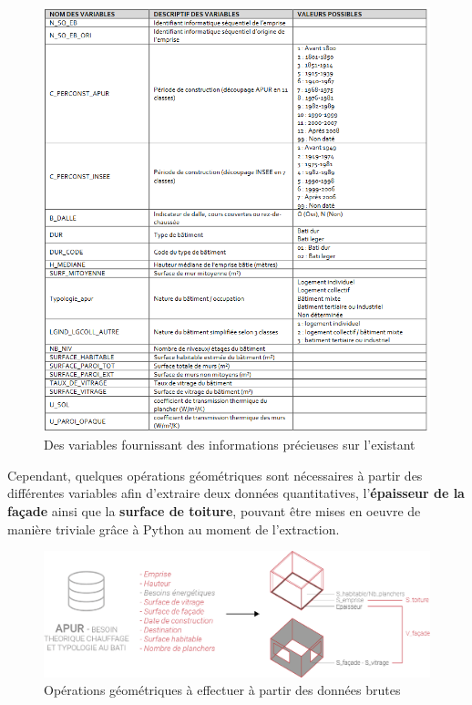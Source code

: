 \documentclass[
  11pt,
  french,
]{article}
\begin{document}
\begin{tcolorbox}
\begin{figure}

{\centering \includegraphics[width=0.9\linewidth]{__imgs/meta_apur} 

}

\caption[Des variables fournissant des informations précieuses sur l'existant  -  \url{https://www.apur.org/open_data/BESOIN_THEORIQUE_CHAUFFAGE_TYPO_BATI_OD.pdf}]{Des variables fournissant des informations précieuses sur l'existant}\label{fig:meta_apur}
\end{figure}
\end{tcolorbox}

Cependant, quelques opérations géométriques sont nécessaires à partir
des différentes variables afin d'extraire deux données quantitatives,
l'\textbf{épaisseur de la façade} ainsi que la \textbf{surface de
toiture}, pouvant être mises en oeuvre de manière triviale grâce à
Python au moment de l'extraction.

\begin{tcolorbox}
\begin{figure}

{\centering \includegraphics[width=0.9\linewidth]{__imgs/schema_apur} 

}

\caption[Opérations géométriques à effectuer à partir des données brutes  -  Réalisation personnelle]{Opérations géométriques à effectuer à partir des données brutes}\label{fig:schema_apur}
\end{figure}
\end{tcolorbox}
\end{document}
